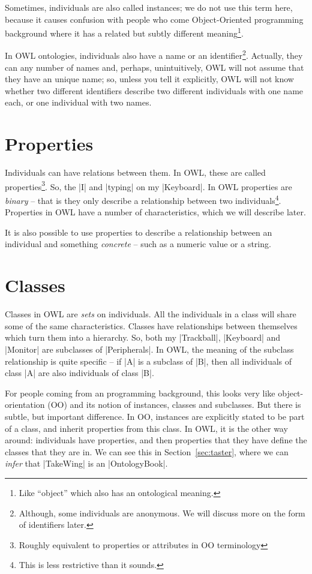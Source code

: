 Sometimes, individuals are also called instances; we do not use this
term here, because it causes confusion with people who come
Object-Oriented programming background where it has a related but
subtly different meaning\footnote{Like ``object'' which also has an
  ontological meaning.}.

In OWL ontologies, individuals also have a name or an
identifier\footnote{Although, some individuals are anonymous. We will
  discuss more on the form of identifiers later.}. Actually, they can
any number of names and, perhaps, unintuitively, OWL will not assume
that they have an unique name; so, unless you tell it explicitly, OWL
will not know whether two different identifiers describe two different
individuals with one name each, or one individual with two names.

\section{Properties}
\label{sec:properties-1}

Individuals can have relations between them. In OWL, these are called
properties\footnote{Roughly equivalent to properties or attributes in
  OO terminology}. So, the |I| and |typing| on my |Keyboard|. In OWL
properties are \emph{binary} -- that is they only describe a
relationship between two individuals\footnote{This is less restrictive
  than it sounds.}. Properties in OWL have a number of
characteristics, which we will describe later.

It is also possible to use properties to describe a relationship
between an individual and something \emph{concrete} -- such as a
numeric value or a string.

\section{Classes}
\label{sec:classes}

Classes in OWL are \emph{sets} on individuals. All the individuals in
a class will share some of the same characteristics. Classes have
relationships between themselves which turn them into a hierarchy. So,
both my |Trackball|, |Keyboard| and |Monitor| are subclasses of
|Peripherals|. In OWL, the meaning of the subclass relationship is
quite specific -- if |A| is a subclass of |B|, then all individuals of
class |A| are also individuals of class |B|.

For people coming from an programming background, this looks very like
object-orientation (OO) and its notion of instances, classes and
subclasses. But there is subtle, but important difference. In OO,
instances are explicitly stated to be part of a class, and inherit
properties from this class. In OWL, it is the other way around:
individuals have properties, and then properties that they have define
the classes that they are in. We can see this in
Section~\ref{sec:taster}, where we can \emph{infer} that |TakeWing| is
an |OntologyBook|.


